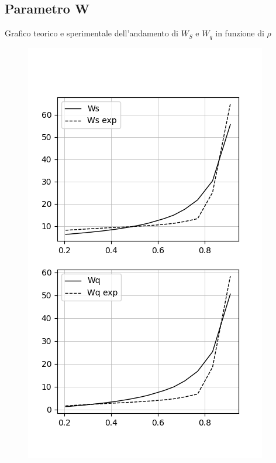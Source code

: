 \documentclass[12pt,a4paper]{article}
\begin{document}
\subsection{Parametro W}
Grafico teorico e sperimentale dell'andamento di $W_S$ e $W_q$ in funzione di $\rho$
\begin{figure}[h]
\centering
\includegraphics[scale=0.8]{W}
\end{figure}
\end{document}
